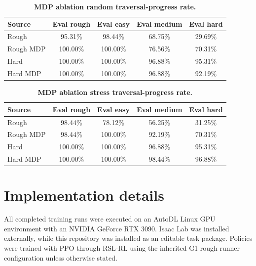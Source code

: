 \documentclass{article}
\begin{document}
\begin{table}[h]
    \caption{\textbf{MDP ablation random traversal-progress rate.}}
    \label{tab:mdp-random-progress}
    \centering
    \begin{tabular}{lcccc}
        \toprule
        Source & Eval rough & Eval easy & Eval medium & Eval hard \\
        \midrule
        Rough & 95.31\% & 98.44\% & 68.75\% & 29.69\% \\
        Rough MDP & 100.00\% & 100.00\% & 76.56\% & 70.31\% \\
        Hard & 100.00\% & 100.00\% & 96.88\% & 95.31\% \\
        Hard MDP & 100.00\% & 100.00\% & 96.88\% & 92.19\% \\
        \bottomrule
    \end{tabular}
\end{table}

\begin{table}[h]
    \caption{\textbf{MDP ablation stress traversal-progress rate.}}
    \label{tab:mdp-stress-progress}
    \centering
    \begin{tabular}{lcccc}
        \toprule
        Source & Eval rough & Eval easy & Eval medium & Eval hard \\
        \midrule
        Rough & 98.44\% & 78.12\% & 56.25\% & 31.25\% \\
        Rough MDP & 98.44\% & 100.00\% & 92.19\% & 70.31\% \\
        Hard & 100.00\% & 100.00\% & 96.88\% & 95.31\% \\
        Hard MDP & 100.00\% & 100.00\% & 98.44\% & 96.88\% \\
        \bottomrule
    \end{tabular}
\end{table}

\clearpage

\section{Implementation details}
\label{app:implementation-details}

All completed training runs were executed on an AutoDL Linux GPU environment with an NVIDIA GeForce RTX 3090. Isaac Lab was installed externally, while this repository was installed as an editable task package. Policies were trained with PPO through RSL-RL using the inherited G1 rough runner configuration unless otherwise stated.
\end{document}

